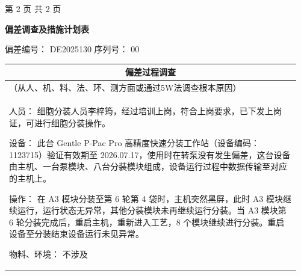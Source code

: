 \documentclass[UTF8,10pt,a4paper,fontset=fandol]{ctexart}
\newcommand{\fieldvalue}[1]{#1}
\begin{document}
\begin{center}
\small 第 2 页 共 2 页
\end{center}

\newpage

\begin{center}
    {\Large \textbf{偏差调查及措施计划表}}\\[0.8em]
\end{center}

\noindent
偏差编号：
\fieldvalue{DE2025130}
\hfill
序列号：
\fieldvalue{00}

\vspace{0.5em}

\noindent
\begin{tabular}{|p{0.17\linewidth}|p{0.79\linewidth}|}
\hline
\multicolumn{2}{|c|}{偏差过程调查} \\
\hline
\multicolumn{2}{|p{0.96\linewidth}|}{\small （从人、机、料、法、环、测方面或通过5W法调查根本原因）} \\
\hline
\multicolumn{2}{|p{0.96\linewidth}|}{
\small
人员：
\fieldvalue{细胞分装人员李梓筠，经过培训上岗，符合上岗要求，已下发上岗证，可进行细胞分装操作。}

设备：
\fieldvalue{此台 Gentle P-Pac Pro 高精度快速分装工作站（设备编码：1123715）验证有效期至 2026.07.17，使用时在转泵没有发生偏差，这台设备由主机、一台泵模块、八台分装模块组成，设备运行过程中数据传输至对应的主机上。}

操作：
\fieldvalue{在 A3 模块分装至第 6 轮第 4 袋时，主机突然黑屏，此时 A3 模块继续运行，运行状态无异常，其他分装模块未再继续运行分装。当 A3 模块第 6 轮分装完成后，重启主机，重新进入工艺，8 个模块继续进行分装。重启设备至分装结束设备运行未见异常。}

物料、环境：
\fieldvalue{不涉及}

}
\end{tabular}
\end{document}
